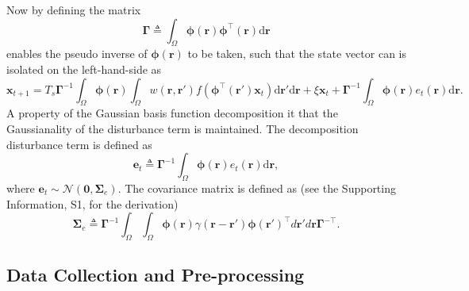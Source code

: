 \documentclass[]{article}
\begin{document}
Now by defining the matrix
\begin{equation}\label{eq:DefGamma}
	\boldsymbol{\Gamma} \triangleq \int_\Omega {\boldsymbol{\phi} \left(\mathbf{r}\right)\boldsymbol{\phi} ^{\top}\left(\mathbf{r}\right)\textrm{d}\mathbf{r}} 
\end{equation}
enables the pseudo inverse of $\boldsymbol{\phi(\mathbf{r})}$ to be taken, such that the state vector can is isolated on the left-hand-side as
\begin{equation}\label{eq:ReducedForm}
	 \mathbf{x}_{t+1} = T_s\boldsymbol{\Gamma}^{-1}
	 \int_\Omega \boldsymbol{\phi}(\mathbf{r}) 
	 \int_\Omega w(\mathbf{r},\mathbf{r}')f(\boldsymbol{\phi}^{\top}(\mathbf{r}')\mathbf{x}_t) \textrm{d}\mathbf{r}' \textrm{d}\mathbf{r} 
	 + \xi\mathbf{x}_t + \boldsymbol{\Gamma}^{-1} \int_\Omega{\boldsymbol{\phi}(\mathbf{r}) e_t(\mathbf{r})\textrm{d}\mathbf{r}}.
\end{equation}
A property of the Gaussian basis function decomposition it that the Gaussianality of the disturbance term is maintained. The decomposition disturbance term is defined as
\begin{equation}\label{eq:Wt} 
	\mathbf{e}_t \triangleq \boldsymbol{\Gamma}^{-1}\int_\Omega {\boldsymbol{\phi} ( \mathbf{r} )e_t( \mathbf{r} )\textrm{d}\mathbf{r}},
\end{equation}
where $\mathbf{e}_t \sim\mathcal{N}(\mathbf 0,\boldsymbol\Sigma_e)$. The covariance matrix is defined as (see the Supporting Information, S1, for the derivation)
\begin{equation}
	\boldsymbol\Sigma_e \triangleq \mathbf{\Gamma}^{-1}\int_{\Omega}\int_{\Omega}\boldsymbol{\phi}\left(\mathbf r\right) \gamma\left(\mathbf r- \mathbf r' \right)\boldsymbol{\phi}\left(\mathbf r'\right)^{\top}d\mathbf r' d\mathbf r\mathbf{\Gamma}^{- \top}. 
\end{equation}

\subsection{Data Collection and Pre-processing}
\end{document}
